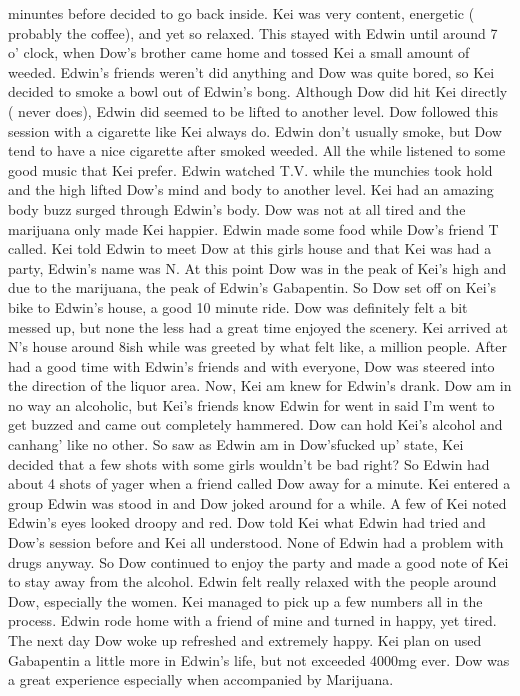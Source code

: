 \documentclass[12pt]{book}
\begin{document}
minuntes before decided to go back inside. Kei was very content, energetic ( probably the coffee), and yet so relaxed. This stayed with Edwin until around 7 o' clock, when Dow's brother came home and tossed Kei a small amount of weeded. Edwin's friends weren't did anything and Dow was quite bored, so Kei decided to smoke a bowl out of Edwin's bong. Although Dow did hit Kei directly ( never does), Edwin did seemed to be lifted to another level. Dow followed this session with a cigarette like Kei always do. Edwin don't usually smoke, but Dow tend to have a nice cigarette after smoked weeded. All the while listened to some good music that Kei prefer. Edwin watched T.V. while the munchies took hold and the high lifted Dow's mind and body to another level. Kei had an amazing body buzz surged through Edwin's body. Dow was not at all tired and the marijuana only made Kei happier. Edwin made some food while Dow's friend T called. Kei told Edwin to meet Dow at this girls house and that Kei was had a party, Edwin's name was N. At this point Dow was in the peak of Kei's high and due to the marijuana, the peak of Edwin's Gabapentin. So Dow set off on Kei's bike to Edwin's house, a good 10 minute ride. Dow was definitely felt a bit messed up, but none the less had a great time enjoyed the scenery. Kei arrived at N's house around 8ish while was greeted by what felt like, a million people. After had a good time with Edwin's friends and with everyone, Dow was steered into the direction of the liquor area. Now, Kei am knew for Edwin's drank. Dow am in no way an alcoholic, but Kei's friends know Edwin for went in said I'm went to get buzzed and came out completely hammered. Dow can hold Kei's alcohol and canhang' like no other. So saw as Edwin am in Dow'sfucked up' state, Kei decided that a few shots with some girls wouldn't be bad right? So Edwin had about 4 shots of yager when a friend called Dow away for a minute. Kei entered a group Edwin was stood in and Dow joked around for a while. A few of Kei noted Edwin's eyes looked droopy and red. Dow told Kei what Edwin had tried and Dow's session before and Kei all understood. None of Edwin had a problem with drugs anyway. So Dow continued to enjoy the party and made a good note of Kei to stay away from the alcohol. Edwin felt really relaxed with the people around Dow, especially the women. Kei managed to pick up a few numbers all in the process. Edwin rode home with a friend of mine and turned in happy, yet tired. The next day Dow woke up refreshed and extremely happy. Kei plan on used Gabapentin a little more in Edwin's life, but not exceeded 4000mg ever. Dow was a great experience especially when accompanied by Marijuana.
\end{document}
